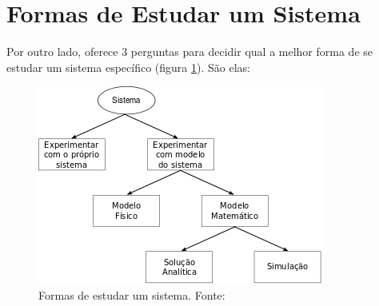 \section{Formas de Estudar um Sistema}

Por outro lado, \cite{Law} oferece 3 perguntas para decidir qual a melhor forma
de se estudar um sistema específico (figura \ref{fig:systemstudy}). São elas:

\begin{figure}[htb!]
\centering\includegraphics{img/systemstudy.png}
\caption{\label{fig:systemstudy}Formas de estudar um sistema. Fonte:~\cite{Law}}
\end{figure}

